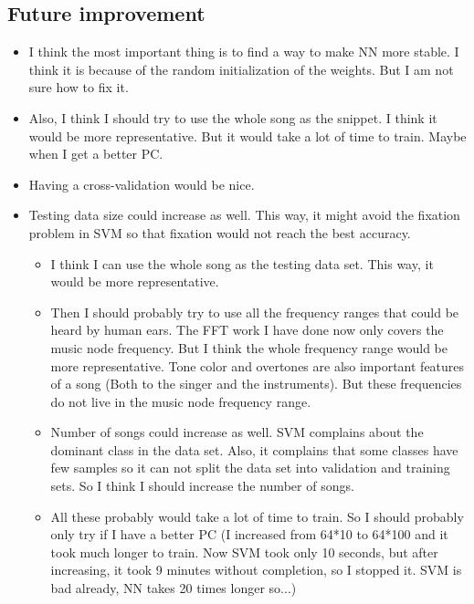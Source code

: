 \documentclass[letterpaper,12pt]{article}
\begin{document}
\subsection{Future improvement}
\begin{itemize}
    \item I think the most important thing is to find a way to make NN more stable. I think it is because of the random initialization of the weights. But I am not sure how to fix it.
    \item Also, I think I should try to use the whole song as the snippet. I think it would be more representative. But it would take a lot of time to train. Maybe when I get a better PC.
    \item Having a cross-validation would be nice.
    \item Testing data size could increase as well. This way, it might avoid the fixation problem in SVM so that fixation would not reach the best accuracy.\begin{itemize}
        \item I think I can use the whole song as the testing data set. This way, it would be more representative.
        \item Then I should probably try to use all the frequency ranges that could be heard by human ears. The FFT work I have done now only covers the music node frequency. But I think the whole frequency range would be more representative. Tone color and overtones are also important features of a song (Both to the singer and the instruments). But these frequencies do not live in the music node frequency range.
        \item Number of songs could increase as well. SVM complains about the dominant class in the data set. Also, it complains that some classes have few samples so it can not split the data set into validation and training sets. So I think I should increase the number of songs.
        \item All these probably would take a lot of time to train. So I should probably only try if I have a better PC (I increased from 64*10 to 64*100 and it took much longer to train. Now SVM took only 10 seconds, but after increasing, it took 9 minutes without completion, so I stopped it. SVM is bad already, NN takes 20 times longer so...)
    \end{itemize}
\end{itemize}
\end{document}

